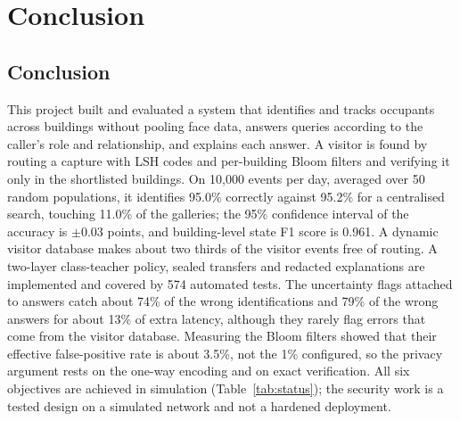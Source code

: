 \documentclass[12pt,a4paper,oneside]{report}
\begin{document}
\clearpage
\chapter{Conclusion}
\section{Conclusion}
This project built and evaluated a system that identifies and tracks occupants across buildings without pooling face data, answers queries according to the caller's role and relationship, and explains each answer. A visitor is found by routing a capture with LSH codes and per-building Bloom filters and verifying it only in the shortlisted buildings. On 10,000 events per day, averaged over 50 random populations, it identifies 95.0\% correctly against 95.2\% for a centralised search, touching 11.0\% of the galleries; the 95\% confidence interval of the accuracy is $\pm0.03$ points, and building-level state F1 score is 0.961. A dynamic visitor database makes about two thirds of the visitor events free of routing. A two-layer class-teacher policy, sealed transfers and redacted explanations are implemented and covered by 574 automated tests. The uncertainty flags attached to answers catch about 74\% of the wrong identifications and 79\% of the wrong answers for about 13\% of extra latency, although they rarely flag errors that come from the visitor database. Measuring the Bloom filters showed that their effective false-positive rate is about 3.5\%, not the 1\% configured, so the privacy argument rests on the one-way encoding and on exact verification. All six objectives are achieved in simulation (Table~\ref{tab:status}); the security work is a tested design on a simulated network and not a hardened deployment.
\end{document}
